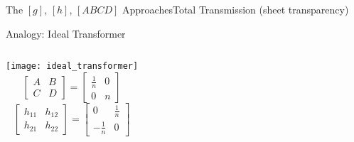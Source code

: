 \begin{frame}[allowframebreaks]{The $[g]$, $[h]$, $[ABCD]$
    Approaches}{Total Transmission (sheet transparency)}
  
  \begin{block}{Analogy: Ideal Transformer}
     \begin{columns}
        \centering
    \texttt{[image: ideal\_transformer]}
      \centering
    \begin{equation*}
      \begin{bmatrix}   A & B \\ C & D  \end{bmatrix}
      = 
      \begin{bmatrix}   \frac{1}{n} & 0 \\ 0 & n  \end{bmatrix}
    \end{equation*}
    \begin{equation*}
      \begin{bmatrix}    h_{11} & h_{12} \\ h_{21}  & h_{22}  \end{bmatrix}
      = 
      \begin{bmatrix}   0 & \frac{1}{n} \\ -\frac{1}{n} & 0  \end{bmatrix}
    \end{equation*}
    \end{columns}
    
  \end{block}


\end{frame}


